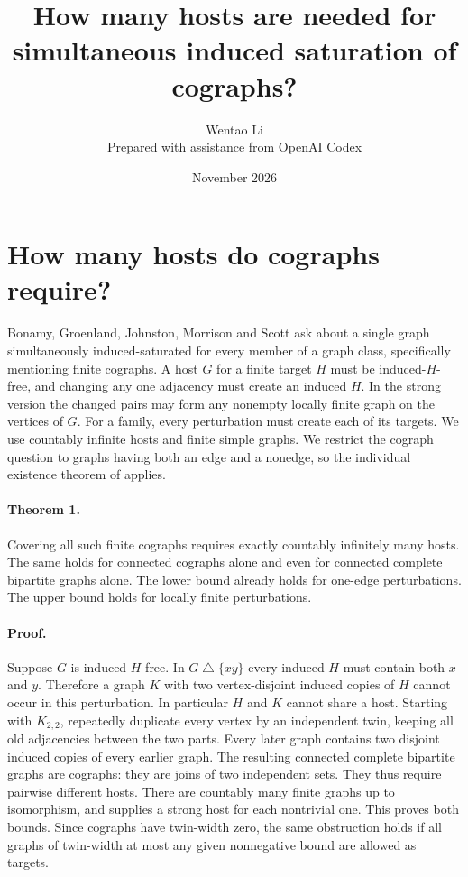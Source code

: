 \documentclass[10pt]{article}
\title{How many hosts are needed for simultaneous induced saturation of cographs?}
\author{Wentao Li\\[2pt]\small Prepared with assistance from OpenAI Codex}
\date{November 2026}
\begin{document}
\maketitle
\section{How many hosts do cographs require?}
Bonamy, Groenland, Johnston, Morrison and Scott \cite[final section]{bgjms} ask about a single graph simultaneously induced-saturated for every member of a graph class, specifically mentioning finite cographs. A host $G$ for a finite target $H$ must be induced-$H$-free, and changing any one adjacency must create an induced $H$. In the strong version the changed pairs may form any nonempty locally finite graph on the vertices of $G$. For a family, every perturbation must create each of its targets. We use countably infinite hosts and finite simple graphs. We restrict the cograph question to graphs having both an edge and a nonedge, so the individual existence theorem of \cite{bgjms} applies.

\paragraph{Theorem 1.} Covering all such finite cographs requires exactly countably infinitely many hosts. The same holds for connected cographs alone and even for connected complete bipartite graphs alone. The lower bound already holds for one-edge perturbations. The upper bound holds for locally finite perturbations.

\paragraph{Proof.} Suppose $G$ is induced-$H$-free. In $G\mathbin\triangle\{xy\}$ every induced $H$ must contain both $x$ and $y$. Therefore a graph $K$ with two vertex-disjoint induced copies of $H$ cannot occur in this perturbation. In particular $H$ and $K$ cannot share a host. Starting with $K_{2,2}$, repeatedly duplicate every vertex by an independent twin, keeping all old adjacencies between the two parts. Every later graph contains two disjoint induced copies of every earlier graph. The resulting connected complete bipartite graphs are cographs: they are joins of two independent sets. They thus require pairwise different hosts. There are countably many finite graphs up to isomorphism, and \cite[Theorem 1.1]{bgjms} supplies a strong host for each nontrivial one. This proves both bounds. Since cographs have twin-width zero, the same obstruction holds if all graphs of twin-width at most any given nonnegative bound are allowed as targets.
\end{document}
